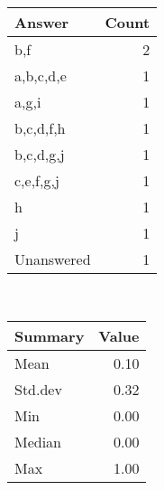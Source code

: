 \documentclass[12pt,english,nohyper]{tufte-handout}\usepackage[]{graphicx}\usepackage[]{color}
\begin{document}
\begin{center}%
\begin{tabular}{lr}
  \hline
Answer & Count \\ 
  \hline
b,f &   2 \\ 
  a,b,c,d,e &   1 \\ 
  a,g,i &   1 \\ 
  b,c,d,f,h &   1 \\ 
  b,c,d,g,j &   1 \\ 
  c,e,f,g,j &   1 \\ 
  h &   1 \\ 
  j &   1 \\ 
  Unanswered &   1 \\ 
   \hline
\end{tabular}
~~~~~~~~%
\begin{tabular}{lr}
  \hline
Summary & Value \\ 
  \hline
Mean & 0.10 \\ 
  Std.dev & 0.32 \\ 
  Min & 0.00 \\ 
  Median & 0.00 \\ 
  Max & 1.00 \\ 
   \hline
\end{tabular}
\end{center}\newpage{}
\end{document}
